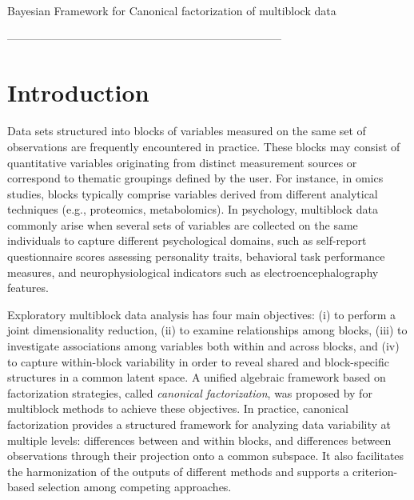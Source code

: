 \documentclass[11pt]{article}
\begin{document}
\renewcommand{\headrulewidth}{0pt}



\begin{center}
{\Large
	{\textsc Bayesian Framework for Canonical factorization of multiblock data}
}
\bigskip

\bigskip

\end{center}
\bigskip

--------------------------------------------------------------------------

\section{Introduction}

Data sets structured into blocks of variables measured on the same set of observations are frequently encountered in practice. These blocks may consist of quantitative variables originating from distinct measurement sources or correspond to thematic groupings defined by the user. For instance, in omics studies, blocks typically comprise variables derived from different analytical techniques (e.g., proteomics, metabolomics). In psychology, multiblock data commonly arise when several sets of variables are collected on the same individuals to capture different psychological domains, such as
self-report questionnaire scores assessing personality traits, behavioral task performance measures, and neurophysiological indicators such as electroencephalography features.

Exploratory multiblock data analysis has four main objectives: (i) to perform a joint dimensionality reduction, (ii) to examine relationships among blocks, (iii) to investigate associations among variables both within and across blocks, and (iv) to capture within-block variability in order to reveal shared and block-specific structures in a common latent space.
A unified algebraic framework based on factorization strategies, called \textit{canonical factorization}, was proposed by \cite{bougeard2024} for multiblock methods to achieve these objectives. In practice, canonical factorization provides a structured framework for analyzing data variability at multiple levels: differences between and within blocks, and
differences between observations through their projection onto a common subspace. It also facilitates the harmonization of the outputs of different methods and supports a criterion-based selection among competing approaches.
\end{document}
